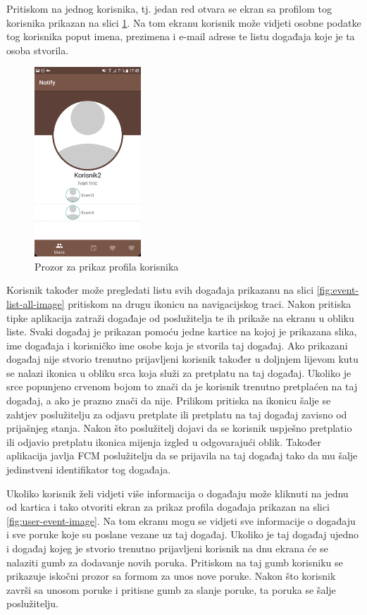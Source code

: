 \documentclass[times, utf8, zavrsni]{fer}
\begin{document}
{Pritiskom na jednog korisnika, tj. jedan red otvara se ekran sa profilom tog korisnika prikazan na slici \ref{fig:user-profile-image}. Na tom ekranu korisnik može vidjeti osobne podatke tog korisnika poput imena, prezimena i e-mail adrese te listu događaja koje je ta osoba stvorila.

\begin{figure}[htb]
\centering
\includegraphics[width=4cm]{img/ss-user-profile.png}
\caption{Prozor za prikaz profila korisnika}
\label{fig:user-profile-image}
\end{figure}

Korisnik također može pregledati listu svih događaja prikazanu na slici \ref{fig:event-list-all-image} pritiskom na drugu ikonicu na navigacijskog traci. Nakon pritiska tipke aplikacija zatraži događaje od poslužitelja te ih prikaže na ekranu u obliku liste. Svaki događaj je prikazan pomoću jedne kartice na kojoj je prikazana slika, ime događaja i korisničko ime osobe koja je stvorila taj događaj. Ako prikazani događaj nije stvorio trenutno prijavljeni korisnik također u doljnjem lijevom kutu se nalazi ikonica u obliku srca koja služi za pretplatu na taj događaj. Ukoliko je srce popunjeno crvenom bojom to znači da je korisnik trenutno pretplaćen na taj događaj, a ako je prazno znači da nije. Prilikom pritiska na ikonicu šalje se zahtjev poslužitelju za odjavu pretplate ili pretplatu na taj događaj zavisno od prijašnjeg stanja. Nakon što poslužitelj dojavi da se korisnik uspješno pretplatio ili odjavio pretplatu ikonica mijenja izgled u odgovarajući oblik. Također aplikacija javlja FCM poslužitelju da se prijavila na taj događaj tako da mu šalje jedinstveni identifikator tog događaja.

Ukoliko korisnik želi vidjeti više informacija o događaju može kliknuti na jednu od kartica i tako otvoriti ekran za prikaz profila događaja prikazan na slici \ref{fig:user-event-image}. Na tom ekranu mogu se vidjeti sve informacije o događaju i sve poruke koje su poslane vezane uz taj događaj. Ukoliko je taj događaj ujedno i događaj kojeg je stvorio trenutno prijavljeni korisnik na dnu ekrana će se nalaziti gumb za dodavanje novih poruka. Pritiskom na taj gumb korisniku se prikazuje iskočni prozor sa formom za unos nove poruke. Nakon što korisnik završi sa unosom poruke i pritisne gumb za slanje poruke, ta poruka se šalje poslužitelju.

}
\end{document}
